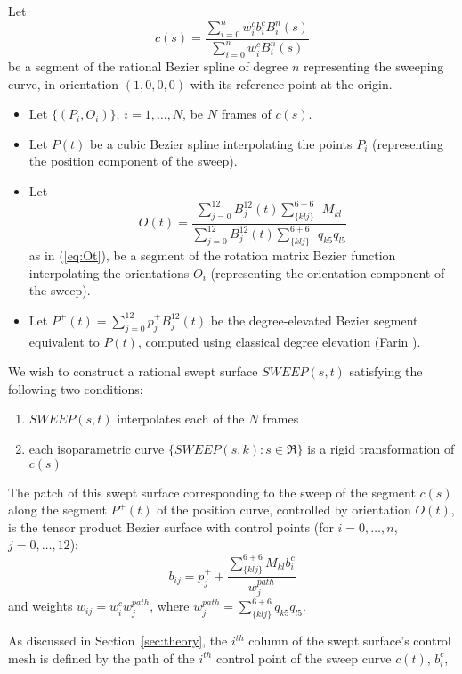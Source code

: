 \begin{theorem}
\label{thm:ten1}
Let
\[
c(s) = \frac{\sum_{i=0}^n w_i^{c} b_i^{c} B_i^n(s)}
	    {\sum_{i=0}^n w_i^{c} B_i^n(s)}
\]
be a segment of the rational Bezier spline of degree $n$
representing the sweeping curve, in orientation $(1,0,0,0)$
with its reference point at the origin.
\begin{itemize}
\item
Let $\{(P_i,O_i)\}$, $i=1,\ldots,N$, be $N$ frames of $c(s)$.
\item
Let $P(t)$ be a cubic Bezier spline interpolating the points $P_i$
(representing the position component of the sweep).
\item
Let 
\[
O(t) = \frac{\sum_{j=0}^{12} B_j^{12}(t) \sum_{\{klj\}}^{6+6}\ \ M_{kl}}
	    {\sum_{j=0}^{12} B_j^{12}(t) \sum_{\{klj\}}^{6+6} \ \ q_{k5}q_{l5}}
\]
as in (\ref{eq:Ot}),
be a segment of the rotation matrix Bezier function
interpolating the orientations $O_i$ 
(representing the orientation component of the sweep).
\item
Let $P^{+}(t) = \sum_{j=0}^{12} p_j^{+} B_j^{12}(t)$
be the degree-elevated Bezier segment equivalent to $P(t)$, 
computed using classical degree elevation (Farin \cite{farin93}).
\end{itemize}

We wish to construct a rational swept surface $SWEEP(s,t)$ satisfying 
the following two conditions:
\begin{enumerate}
\item $SWEEP(s,t)$ interpolates each of the $N$ frames
\item each isoparametric curve $\{SWEEP(s,k) : s \in \Re \}$
	is a rigid transformation of $c(s)$
\end{enumerate}
The patch of this swept surface corresponding to the sweep of the segment
$c(s)$ along the segment $P^{+}(t)$ of the position curve, controlled 
by orientation $O(t)$, is the tensor product Bezier surface with control points
(for $i=0,\ldots,n$, $j=0,\ldots,12$):
\[
b_{ij} = p_j^{+} + \frac{\sum_{\{klj\}}^{6+6} M_{kl} b_i^{c}}{w_j^{path}}
\]
and weights $w_{ij} = w_i^{c}  w_j^{path}$,
where $w_j^{path} = \sum_{\{klj\}}^{6+6} q_{k5} q_{l5}$.
\end{theorem}
\prf
As discussed in Section~\ref{sec:theory},
the $i^{th}$ column of the swept surface's control mesh is defined by
the path of the $i^{th}$ control point of the sweep curve $c(t)$, $b_i^{c}$, 

